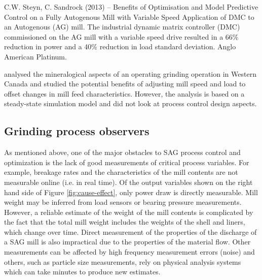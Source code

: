 C.W. Steyn, C. Sandrock (2013) – Benefits of Optimisation and Model Predictive Control on a Fully Autogenous Mill with Variable Speed Application of DMC to an Autogenous (AG) mill. The industrial dynamic matrix controller (DMC) commissioned on the AG mill with a variable speed drive resulted in a 66\% reduction in power and a 40\% reduction in load standard deviation. Anglo American Platinum.

\cite{liu_development_2018} analysed the mineralogical aspects of an operating grinding operation in Western Canada and studied the potential benefits of adjusting mill speed and load to offset changes in mill feed characteristics. However, the analysis is based on a steady-state simulation model and did not look at process control design aspects.


\subsection*{Grinding process observers}

As mentioned above, one of the major obstacles to SAG process control and optimization is the lack of good measurements of critical process variables. For example, breakage rates and the characteristics of the mill contents are not measurable online (i.e. in real time). Of the output variables shown on the right hand side of Figure \ref{fig:cause-effect}, only power draw is directly measurable. Mill weight may be inferred from load sensors or bearing pressure measurements. However, a reliable estimate of the weight of the mill contents is complicated by the fact that the total mill weight includes the weights of the shell and liners, which change over time. Direct measurement of the properties of the discharge of a SAG mill is also impractical due to the properties of the material flow.  Other measurements can be affected by high frequency measurement errors (noise) and others, such as particle size measurements, rely on physical analysis systems which can take minutes to produce new estimates.

